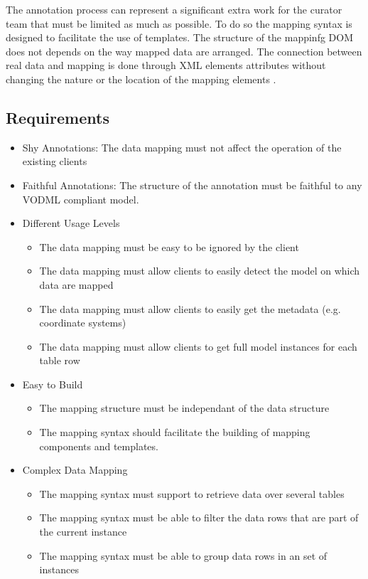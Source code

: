 \documentclass[11pt,a4paper]{ivoa}
\begin{document}
The annotation process can represent a significant extra work for the curator team that must be limited as much as possible. To do so the mapping syntax is designed to facilitate the use of templates. The structure of the mappinfg DOM does not depends on the way mapped data are arranged. The connection between  real data and mapping is done through XML elements attributes without changing the nature or the location of the mapping elements . 


\subsection{Requirements}

\begin{itemize}
\item Shy Annotations: The data mapping must not affect the operation of the existing clients

\item Faithful Annotations: The structure of the annotation must be faithful to any VODML compliant model. 


\item Different Usage Levels 
\begin{itemize}
   \item The data mapping must be easy to be ignored by the client
   \item The data mapping must allow clients to easily detect the model on which data are mapped
   \item The data mapping must allow clients to easily get the metadata (e.g. coordinate systems)
   \item The data mapping must allow clients to get full model instances for each table row
\end{itemize}

\item Easy to Build 
\begin{itemize}
   \item The mapping structure must be independant of the data structure
   \item The mapping syntax should facilitate the building of mapping components and templates.
\end{itemize}

\item Complex Data Mapping 
\begin{itemize}
   \item The mapping syntax must support to retrieve data over several tables
   \item The mapping syntax must be able to filter the data rows that are part of the current instance
   \item The mapping syntax must be able to group data rows in an set of instances
\end{itemize}
\end{itemize}
\end{document}
